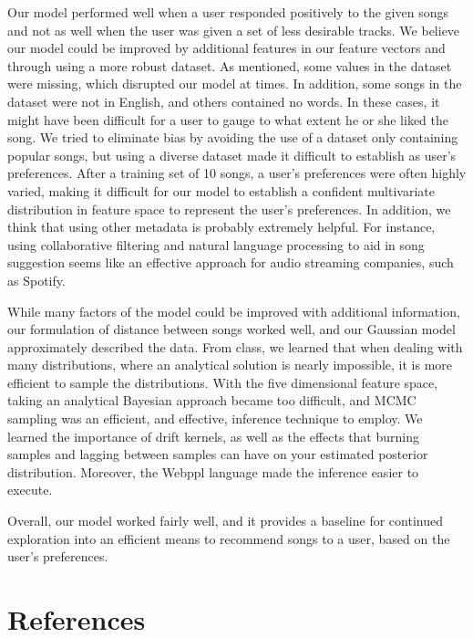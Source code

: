 \documentclass{amsart}
\theoremstyle{plain}
\theoremstyle{definition}
\begin{document}
   	Our model performed well when a user responded positively to the given songs and not as well when the user was given a set of less desirable tracks. We believe our model could be improved by additional features in our feature vectors and through using a more robust dataset. As mentioned, some values in the dataset were missing, which disrupted our model at times. In addition, some songs in the dataset were not in English, and others contained no words. In these cases, it might have been difficult for a user to gauge to what extent he or she liked the song. We tried to eliminate bias by avoiding the use of a dataset only containing popular songs, but using a diverse dataset made it difficult to establish as user's preferences. After a training set of 10 songs, a user's preferences were often highly varied, making it difficult for our model to establish a confident multivariate distribution in feature space to represent the user's preferences. In addition, we think that using other metadata is probably extremely helpful. For instance, using collaborative filtering and natural language processing to aid in song suggestion seems like an effective approach for audio streaming companies, such as Spotify.
   	
   	While many factors of the model could be improved with additional information, our formulation of distance between songs worked well, and our Gaussian model approximately described the data. From class, we learned that when dealing with many distributions, where an analytical solution is nearly impossible, it is more efficient to sample the distributions. With the five dimensional feature space, taking an analytical Bayesian approach became too difficult, and MCMC sampling was an efficient, and effective, inference technique to employ. We learned the importance of drift kernels, as well as the effects that burning samples and lagging between samples can have on your estimated posterior distribution. Moreover, the Webppl language made the inference easier to execute.
   	
   	Overall, our model worked fairly well, and it provides a baseline for continued exploration into an efficient means to recommend songs to a user, based on the user's preferences.

	   	
   	\section{References}
   	
\end{document}

